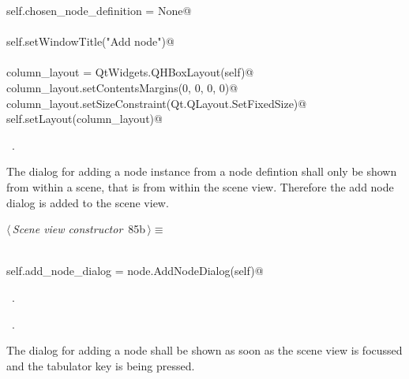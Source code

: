 \documentclass[
    a4paper,      %
    10pt,         %
    openright,    %
    notitlepage,  %
    parskip=half, %
]{scrreprt}       %
\theoremstyle{definition}                    %
\begin{document}
\begin{flushleft}
\begin{minipage}{\linewidth}
\begin{list}{}{}
\mbox{}\lstinline@        self.chosen_node_definition = None@\\
\mbox{}\lstinline@@\\
\mbox{}\lstinline@        self.setWindowTitle("Add node")@\\
\mbox{}\lstinline@@\\
\mbox{}\lstinline@        column_layout = QtWidgets.QHBoxLayout(self)@\\
\mbox{}\lstinline@        column_layout.setContentsMargins(0, 0, 0, 0)@\\
\mbox{}\lstinline@        column_layout.setSizeConstraint(Qt.QLayout.SetFixedSize)@\\
\mbox{}\lstinline@        self.setLayout(column_layout)@{\NWsep}
\end{list}
\vspace{-1.5ex}
\footnotesize
\begin{list}{}{\setlength{\itemsep}{-\parsep}\setlength{\itemindent}{-\leftmargin}}
\item \NWtxtMacroRefIn\ .

\item{}
\end{list}
\end{minipage}\vspace{4ex}
\end{flushleft}
The dialog for adding a node instance from a node defintion shall only be shown
from within a scene, that is from within the scene view.
Therefore the add node dialog is added to the scene view.

\begin{flushleft} \small
\begin{minipage}{\linewidth}\label{scrap137}\raggedright\small
{} $\langle\,${\itshape Scene view constructor}\nobreak\ {\footnotesize {85b}}$\,\rangle\equiv$
\vspace{-1exm}
\begin{list}{}{} \item
\mbox{}\lstinline@@\\
\mbox{}\lstinline@    self.add_node_dialog = node.AddNodeDialog(self)@\\
\mbox{}\lstinline@@{\NWsep}
\end{list}
\vspace{-1.5ex}
\footnotesize
\begin{list}{}{\setlength{\itemsep}{-\parsep}\setlength{\itemindent}{-\leftmargin}}
\item \NWtxtMacroDefBy\ .
\item \NWtxtMacroRefIn\ .

\item{}
\end{list}
\end{minipage}\vspace{4ex}
\end{flushleft}
The dialog for adding a node shall be shown as soon as the scene view is
focussed and the tabulator key is being pressed.
\end{document}
